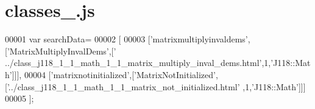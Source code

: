 \hypertarget{classes__0_8js_source}{}\section{classes\+\_.\+js}
\label{classes__0_8js_source}

\begin{DoxyCode}
00001 var searchData=
00002 [
00003   [\textcolor{stringliteral}{'matrixmultiplyinvaldems'},[\textcolor{stringliteral}{'MatrixMultiplyInvalDems'},[\textcolor{stringliteral}{'
      ../class\_j118\_1\_1\_math\_1\_1\_matrix\_multiply\_inval\_dems.html'},1,\textcolor{stringliteral}{'J118::Math'}]]],
00004   [\textcolor{stringliteral}{'matrixnotinitialized'},[\textcolor{stringliteral}{'MatrixNotInitialized'},[\textcolor{stringliteral}{'../class\_j118\_1\_1\_math\_1\_1\_matrix\_not\_initialized.html'}
      ,1,\textcolor{stringliteral}{'J118::Math'}]]]
00005 ];
\end{DoxyCode}
